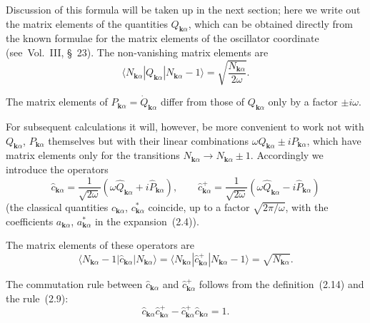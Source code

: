 Discussion of this formula will be taken up in the next section; here we write out the matrix elements of the quantities $Q_{\mathbf{k}\alpha}$,
which can be obtained directly from the known formulae for the matrix elements of the oscillator coordinate (see~Vol.~III, \S~23). The non-vanishing matrix elements are
\begin{equation}
\langle N_{\mathbf{k}\alpha} | Q_{\mathbf{k}\alpha} | N_{\mathbf{k}\alpha} - 1\rangle = \sqrt{\frac{N_{\mathbf{k}\alpha}}{2\omega}}.
\tag{2.13}
\end{equation}

The matrix elements of $P_{\mathbf{k}\alpha} = \dot{Q}_{\mathbf{k}\alpha}$ differ from those of $Q_{\mathbf{k}\alpha}$ only by a factor $\pm i\omega$.

For subsequent calculations it will, however, be more convenient to work not with $Q_{\mathbf{k}\alpha}$, $P_{\mathbf{k}\alpha}$ themselves but with their linear combinations $\omega Q_{\mathbf{k}\alpha} \pm iP_{\mathbf{k}\alpha}$, which have matrix elements only for the transitions $N_{\mathbf{k}\alpha} \to N_{\mathbf{k}\alpha} \pm 1$. Accordingly we introduce the operators
\begin{equation}
\hat{c}_{\mathbf{k}\alpha} = \frac{1}{\sqrt{2\omega}}(\omega\hat{Q}_{\mathbf{k}\alpha} + i\hat{P}_{\mathbf{k}\alpha}), \qquad
\hat{c}_{\mathbf{k}\alpha}^+ = \frac{1}{\sqrt{2\omega}}(\omega\hat{Q}_{\mathbf{k}\alpha} - i\hat{P}_{\mathbf{k}\alpha})
\tag{2.14}
\end{equation}
(the classical quantities $c_{\mathbf{k}\alpha}$, $c_{\mathbf{k}\alpha}^*$ coincide, up to a factor $\sqrt{2\pi/\omega}$, with the coefficients $a_{\mathbf{k}\alpha}$, $a_{\mathbf{k}\alpha}^*$ in the expansion~(2.4)).

The matrix elements of these operators are
\begin{equation}
\langle N_{\mathbf{k}\alpha} - 1 | \hat{c}_{\mathbf{k}\alpha} | N_{\mathbf{k}\alpha}\rangle = \langle N_{\mathbf{k}\alpha} | \hat{c}_{\mathbf{k}\alpha}^+ | N_{\mathbf{k}\alpha} - 1\rangle = \sqrt{N_{\mathbf{k}\alpha}}.
\tag{2.15}
\end{equation}

The commutation rule between $\hat{c}_{\mathbf{k}\alpha}$ and $\hat{c}_{\mathbf{k}\alpha}^+$ follows from the definition~(2.14) and the rule~(2.9):
\begin{equation}
\hat{c}_{\mathbf{k}\alpha}\hat{c}_{\mathbf{k}\alpha}^+ - \hat{c}_{\mathbf{k}\alpha}^+\hat{c}_{\mathbf{k}\alpha} = 1.
\tag{2.16}
\end{equation}

